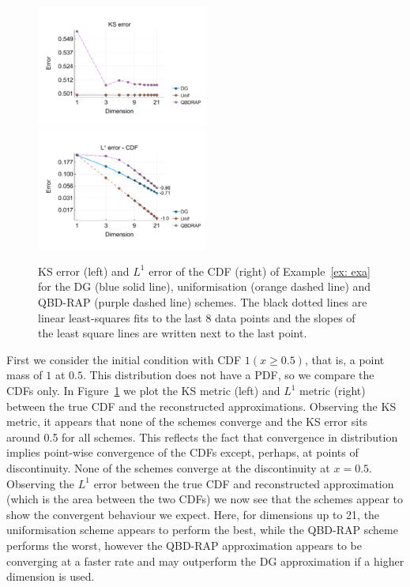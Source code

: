 \begin{example}\label{ex: exa}
	\begin{figure}[h]
		\centering
		\includegraphics[width=0.5\textwidth,trim={0.5cm 0.8cm 0.2cm 1.25cm},clip]{chapter6/figs/comp/fun1/meshs_ks_error_formatted.pdf}%
		\includegraphics[width=0.5\textwidth,trim={0.5cm 0.8cm 0.2cm 1.25cm},clip]{chapter6/figs/comp/fun1/meshs_l1_cdf_error_formatted.pdf}
		\caption{KS error (left) and \(L^1\) error of the CDF (right) of Example~\ref{ex: exa} for the DG (blue solid line), uniformisation (orange dashed line) and QBD-RAP (purple dashed line) schemes. The black dotted lines are linear least-squares fits to the last 8 data points and the slopes of the least square lines are written next to the last point.}
		\label{fig: fun 1 comp} 
	\end{figure}
	First we consider the initial condition with CDF \(1(x\geq 0.5)\), that is, a point mass of \(1\) at \(0.5\). This distribution does not have a PDF, so we compare the CDFs only. In Figure~\ref{fig: fun 1 comp} we plot the KS metric (left) and \(L^1\) metric (right) between the true CDF and the reconstructed approximations. Observing the KS metric, it appears that none of the schemes converge and the KS error sits around 0.5 for all schemes. This reflects the fact that convergence in distribution implies point-wise convergence of the CDFs except, perhaps, at points of discontinuity. None of the schemes converge at the discontinuity at \(x=0.5\). Observing the \(L^1\) error between the true CDF and reconstructed approximation (which is the area between the two CDFs) we now see that the schemes appear to show the convergent behaviour we expect. Here, for dimensions up to 21, the uniformisation scheme appears to perform the best, while the QBD-RAP scheme performs the worst, however the QBD-RAP approximation appears to be converging at a faster rate and may outperform the DG approximation if a higher dimension is used.


\end{example}
